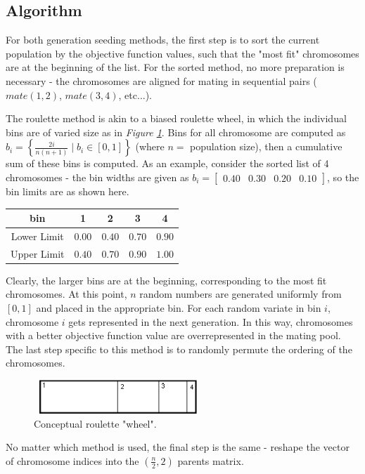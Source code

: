 \documentclass{book}
\newcommand{\textcode}[1]{\textsf{\small #1}}   %
\begin{document}
\subsection*{Algorithm}

For both generation seeding methods, the first step is to sort the current
population by the objective function values, such that the "most fit"
chromosomes are at the beginning of the list. For the sorted method, no more
preparation is necessary - the chromosomes are aligned for mating in
sequential pairs ($mate\left( 1,2\right) $, $mate\left( 3,4\right) $,
etc...).

The roulette method is akin to a biased roulette wheel, in which the
individual bins are of varied size as in \emph{Figure \ref{fig_roulette}}.
Bins for all chromosome are computed as $b_{i}=\left\{ \frac{2i}{n\left(
n+1\right) }\mid b_{i}\in \left[ 0,1\right] \right\} $ (where $n=$
population size), then a cumulative sum of these bins is computed. As an
example, consider the sorted list of 4 chromosomes - the bin widths are
given as $b_{i}=%
\begin{bmatrix}
0.40 & 0.30 & 0.20 & 0.10%
\end{bmatrix}%
$, so the bin limits are as shown here.

\begin{center}
\begin{tabular}{|c|c|c|c|c|}
\hline\hline
bin & 1 & 2 & 3 & 4 \\ \hline\hline
Lower Limit & $0.00$ & $0.40$ & $0.70$ & $0.90$ \\
Upper Limit & $0.40$ & $0.70$ & $0.90$ & $1.00$ \\ \hline
\end{tabular}
\end{center}

Clearly, the larger bins are at the beginning, corresponding to the most fit
chromosomes. At this point, $n$ random numbers are generated uniformly from $%
\left[ 0,1\right] $ and placed in the appropriate bin. For each random
variate in bin $i$, chromosome $i$ gets represented in the next generation.
In this way, chromosomes with a better objective function value are
overrepresented in the mating pool. The last step specific to this method is
to randomly permute the ordering of the chromosomes.
\begin{figure}[htbp]
\begin{center}
\includegraphics[width=2.5in, height=0.5in]{roulettepic}
\end{center}
\caption{Conceptual roulette "wheel".}
\label{fig_roulette}
\end{figure}
No matter which method is used, the final step is the same -
reshape the vector of chromosome indices into the $\left(
\frac{n}{2},2\right) $ \textcode{parents} matrix.
\end{document}
